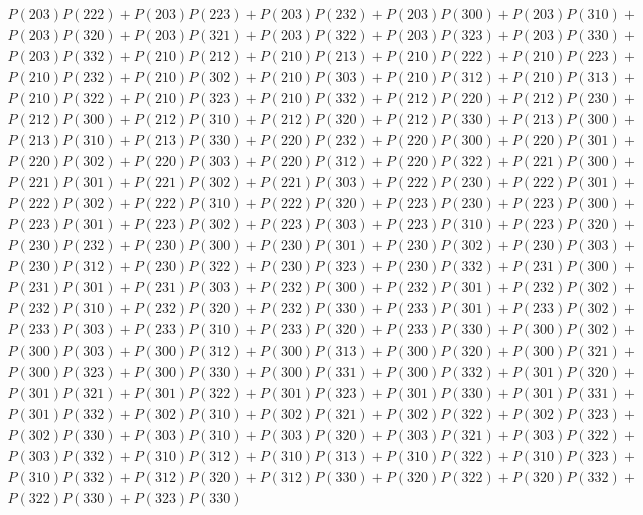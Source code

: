 \documentclass{article}
\theoremstyle{definition}
\begin{document}
\begin{gather*}
        P(203)P(222) + P(203)P(223) + P(203)P(232) + P(203)P(300) + P(203)P(310) +\\
        P(203)P(320) + P(203)P(321) + P(203)P(322) + P(203)P(323) + P(203)P(330) +\\
        P(203)P(332) + P(210)P(212) + P(210)P(213) + P(210)P(222) + P(210)P(223) +\\
        P(210)P(232) + P(210)P(302) + P(210)P(303) + P(210)P(312) + P(210)P(313) +\\
        P(210)P(322) + P(210)P(323) + P(210)P(332) + P(212)P(220) + P(212)P(230) +\\
        P(212)P(300) + P(212)P(310) + P(212)P(320) + P(212)P(330) + P(213)P(300) +\\
        P(213)P(310) + P(213)P(330) + P(220)P(232) + P(220)P(300) + P(220)P(301) +\\
        P(220)P(302) + P(220)P(303) + P(220)P(312) + P(220)P(322) + P(221)P(300) +\\
        P(221)P(301) + P(221)P(302) + P(221)P(303) + P(222)P(230) + P(222)P(301) +\\
        P(222)P(302) + P(222)P(310) + P(222)P(320) + P(223)P(230) + P(223)P(300) +\\
        P(223)P(301) + P(223)P(302) + P(223)P(303) + P(223)P(310) + P(223)P(320) +\\
        P(230)P(232) + P(230)P(300) + P(230)P(301) + P(230)P(302) + P(230)P(303) +\\
        P(230)P(312) + P(230)P(322) + P(230)P(323) + P(230)P(332) + P(231)P(300) +\\
        P(231)P(301) + P(231)P(303) + P(232)P(300) + P(232)P(301) + P(232)P(302) +\\
        P(232)P(310) + P(232)P(320) + P(232)P(330) + P(233)P(301) + P(233)P(302) +\\
        P(233)P(303) + P(233)P(310) + P(233)P(320) + P(233)P(330) + P(300)P(302) +\\
        P(300)P(303) + P(300)P(312) + P(300)P(313) + P(300)P(320) + P(300)P(321) +\\
        P(300)P(323) + P(300)P(330) + P(300)P(331) + P(300)P(332) + P(301)P(320) +\\
        P(301)P(321) + P(301)P(322) + P(301)P(323) + P(301)P(330) + P(301)P(331) +\\
        P(301)P(332) + P(302)P(310) + P(302)P(321) + P(302)P(322) + P(302)P(323) +\\
        P(302)P(330) + P(303)P(310) + P(303)P(320) + P(303)P(321) + P(303)P(322) +\\
        P(303)P(332) + P(310)P(312) + P(310)P(313) + P(310)P(322) + P(310)P(323) +\\
        P(310)P(332) + P(312)P(320) + P(312)P(330) + P(320)P(322) + P(320)P(332) +\\
        P(322)P(330) + P(323)P(330)
    \end{gather*}
\end{document}
